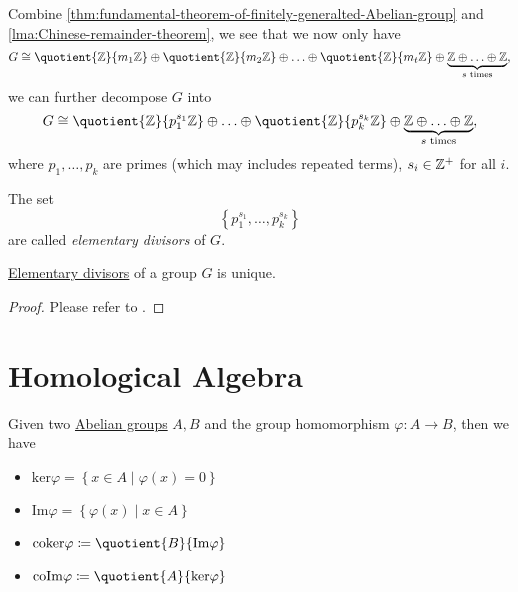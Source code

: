 Combine \autoref{thm:fundamental-theorem-of-finitely-generalted-Abelian-group} and \autoref{lma:Chinese-remainder-theorem}, we see that we now only have
\[
	G\cong \quotient{\mathbb{\MakeUppercase{z}} }{m_1 \mathbb{\MakeUppercase{z}} } \oplus \quotient{\mathbb{\MakeUppercase{z}} }{m_2 \mathbb{\MakeUppercase{z}} } \oplus \ldots \oplus \quotient{\mathbb{\MakeUppercase{z}} }{m_t \mathbb{\MakeUppercase{z}} }  \oplus \underbrace{\mathbb{\MakeUppercase{z}} \oplus \ldots \oplus \mathbb{\MakeUppercase{z}}  }_{s \text{ times}},
\]
we can further decompose \(G\) into
\[
	G\cong \quotient{\mathbb{\MakeUppercase{z}} }{p_1^{s_1}\mathbb{\MakeUppercase{z}} }\oplus \ldots \oplus \quotient{\mathbb{\MakeUppercase{z}} }{p_k^{s_k}\mathbb{\MakeUppercase{z}} }   \oplus \underbrace{\mathbb{\MakeUppercase{z}} \oplus \ldots \oplus \mathbb{\MakeUppercase{z}}  }_{s \text{ times}},
\]
where \(p_1, \ldots , p_{k}  \) are primes (which may includes repeated terms), \(s_{i} \in \mathbb{\MakeUppercase{z}} ^+\) for all \(i\).

\begin{definition}\label{def:elementary-divisors}
	The set
	\[
		\left\{p_1^{s_1}, \ldots , p_{k}^{s_k} \right\}
	\]
	are called \emph{elementary divisors} of \(G\).
\end{definition}

\begin{theorem}\label{thm:uniqueness-of-elementary-divisors}
	\hyperref[def:elementary-divisors]{Elementary divisors} of a group \(G\) is unique.
\end{theorem}
\begin{proof}
	Please refer to \cite{armstrong2013basic}.
\end{proof}

\section{Homological Algebra}
\begin{prev}
	Given two \hyperref[def:Abelian-group]{Abelian groups} \(A, B\) and the group homomorphism \(\varphi\colon A\to B\), then we have
	\begin{itemize}
		\item \(\mathrm{ker} \varphi = \left\{x\in A\mid \varphi (x) = 0\right\}\)
		\item \(\mathrm{Im} \varphi = \left\{\varphi (x)\mid x\in A\right\} \)
		\item \(\mathrm{coker}\varphi \coloneqq \quotient{B}{\mathrm{Im} \varphi}\)
		\item \(\mathrm{coIm} \varphi \coloneqq \quotient{A}{\mathrm{ker} \varphi}\)
	\end{itemize}
\end{prev}

